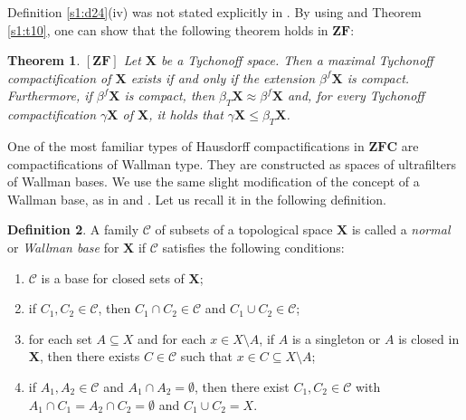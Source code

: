 \documentclass[12pt,twoside,leqno]{article}
\theoremstyle{plain}
\newtheorem{theorem}{Theorem}[section]
\theoremstyle{definition}
\newtheorem{definition}[theorem]{Definition}
\theoremstyle{remark}
\begin{document}
Definition \ref{s1:d24}(iv) was not stated explicitly in \cite{kw1}. By using \cite[Proposition 3.6]{kw1} and Theorem \ref{s1:t10}, one can show that the following theorem holds in $\mathbf{ZF}$:

\begin{theorem}
	\label{s1:t25}
	$[\mathbf{ZF}]$ Let $\mathbf{X}$ be a Tychonoff space. Then a maximal Tychonoff compactification of $\mathbf{X}$ exists if and only if the extension $\beta^{f}\mathbf{X}$ is compact. Furthermore, if $\beta^{f}\mathbf{X}$ is compact, then $\beta_{T}\mathbf{X}\approx\beta^{f}\mathbf{X}$ and, for every Tychonoff compactification $\gamma\mathbf{X}$ of $\mathbf{X}$, it holds that $\gamma\mathbf{X}\leq\beta_{T}\mathbf{X}$.
\end{theorem} 

One of the most familiar types of Hausdorff compactifications in $\mathbf{ZFC}$ are compactifications of Wallman type. They are constructed as spaces of ultrafilters of Wallman bases. We use the same slight modification of the concept of a Wallman base, as in \cite{pw} and \cite{kw1}. Let us recall it in the following definition.

\begin{definition}
	\label{s1:d26}
	A family $\mathcal{C}$ of subsets of a topological space $\mathbf{X}$ is called a \emph{normal} or \emph{Wallman base} for $\mathbf{X}$ if $\mathcal{C}$ satisfies the following conditions:
	\begin{enumerate} 
		\item[(i)] $\mathcal{C}$ is a base for closed sets of $\mathbf{X}$;
		\item[(ii)] if $C_1, C_2\in\mathcal{C}$, then $C_1\cap C_2\in\mathcal{C}$ and $C_1\cup C_2\in\mathcal{C}$;
		\item[(iii)] for each set $A\subseteq X$ and for each $x\in X\setminus A$, if $A$ is a singleton or $A$ is closed in $\mathbf{X}$, then there exists $C\in\mathcal{C}$ such that $x\in C\subseteq X\setminus A$;
		\item[(iv)] if $A_1, A_2\in\mathcal{C}$ and $A_1\cap A_2=\emptyset$, then there exist $C_1, C_2\in\mathcal{C}$ with $A_1\cap C_1=A_2\cap C_2=\emptyset$  and $C_1\cup C_2=X$.
	\end{enumerate}
\end{definition}
\end{document}
